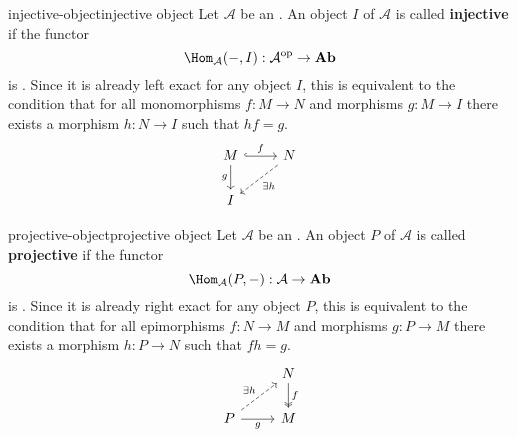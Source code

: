 \begin{topic}{injective-object}{injective object}
    Let $\mathcal{A}$ be an . An object $I$ of $\mathcal{A}$ is called \textbf{injective} if the functor
    \[ \Hom_\mathcal{A}(-, I) : \mathcal{A}^\text{op} \to \textbf{Ab} \]
    is . Since it is already left exact for any object $I$, this is equivalent to the condition that for all monomorphisms $f : M \to N$ and morphisms $g : M \to I$ there exists a morphism $h : N \to I$ such that $hf = g$.
    \[ \begin{tikzcd} M \arrow[hookrightarrow]{r}{f} \arrow[swap]{d}{g} & N \arrow[dashed]{ld}{\exists h} \\ I & \end{tikzcd} \]
\end{topic}

\begin{topic}{projective-object}{projective object}
    Let $\mathcal{A}$ be an . An object $P$ of $\mathcal{A}$ is called \textbf{projective} if the functor
    \[ \Hom_\mathcal{A}(P, -) : \mathcal{A} \to \textbf{Ab} \]
    is . Since it is already right exact for any object $P$, this is equivalent to the condition that for all epimorphisms $f : N \to M$ and morphisms $g : P \to M$ there exists a morphism $h : P \to N$ such that $fh = g$.
    \[ \begin{tikzcd} & N \arrow[twoheadrightarrow]{d}{f} \\ P \arrow[swap]{r}{g} \arrow[dashed]{ur}{\exists h} & M \end{tikzcd} \]
\end{topic}

